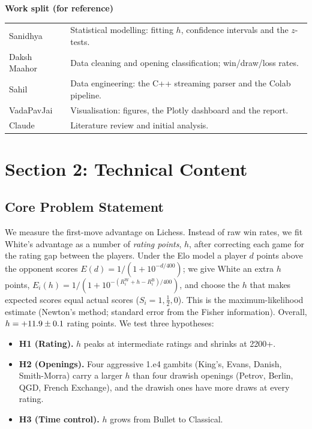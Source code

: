 \documentclass[11pt,a4paper]{article}
\begin{document}
\vspace{8pt}
\textbf{Work split (for reference)}

\begin{tabularx}{\linewidth}{@{}>{\raggedright\arraybackslash}p{2.8cm}X@{}}
Sanidhya & Statistical modelling: fitting $h$, confidence intervals and the $z$-tests. \\
Daksh Maahor & Data cleaning and opening classification; win/draw/loss rates. \\
Sahil & Data engineering: the C++ streaming parser and the Colab pipeline. \\
VadaPavJai & Visualisation: figures, the Plotly dashboard and the report. \\
Claude & Literature review and initial analysis. \\
\end{tabularx}

\newpage


\section*{Section 2: Technical Content}

\subsection*{Core Problem Statement}
We measure the first-move advantage on Lichess. Instead of raw win rates, we fit White's
advantage as a number of \emph{rating points}, $h$, after correcting each game for the rating
gap between the players. Under the Elo model a player $d$ points above the opponent scores
$E(d)=1/(1+10^{-d/400})$; we give White an extra $h$ points,
$E_i(h)=1/(1+10^{-(R^{\mathrm W}_i+h-R^{\mathrm B}_i)/400})$, and choose the $h$ that makes
expected scores equal actual scores ($S_i=1,\tfrac12,0$). This is the maximum-likelihood
estimate (Newton's method; standard error from the Fisher information). Overall,
$h = +11.9 \pm 0.1$ rating points. We test three hypotheses:
\begin{itemize}
\item \textbf{H1 (Rating).} $h$ peaks at intermediate ratings and shrinks at 2200+.
\item \textbf{H2 (Openings).} Four aggressive 1.e4 gambits (King's, Evans, Danish, Smith-Morra)
  carry a larger $h$ than four drawish openings (Petrov, Berlin, QGD, French Exchange), and the
  drawish ones have more draws at every rating.
\item \textbf{H3 (Time control).} $h$ grows from Bullet to Classical.
\end{itemize}
\end{document}
